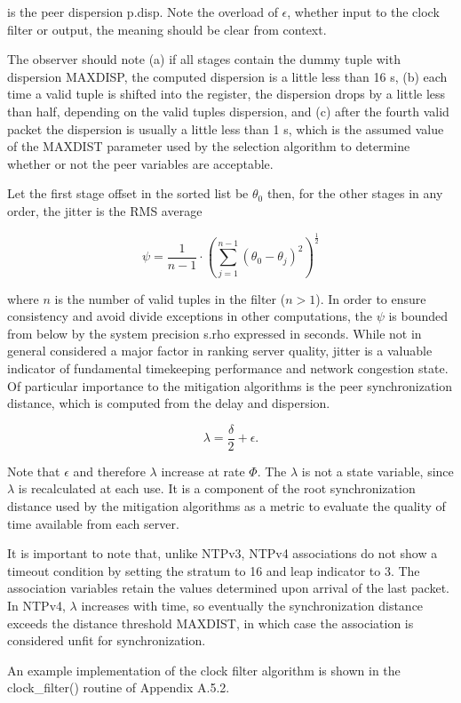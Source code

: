 is the peer dispersion p.disp.  Note the overload of $ \epsilon $, whether
input to the clock filter or output, the meaning should be clear from
context.

The observer should note (a) if all stages contain the dummy tuple
with dispersion MAXDISP, the computed dispersion is a little less
than 16 s, (b) each time a valid tuple is shifted into the register,
the dispersion drops by a little less than half, depending on the
valid tuples dispersion, and (c) after the fourth valid packet the
dispersion is usually a little less than 1 s, which is the assumed
value of the MAXDIST parameter used by the selection algorithm to
determine whether or not the peer variables are acceptable.

Let the first stage offset in the sorted list be $ \theta_0 $\; then, for
the other stages in any order, the jitter is the RMS average

$$
\psi = \frac{1}{n - 1} \cdot \left( \sum^{n - 1}_{j = 1} (\theta_0 - \theta_j)^2 \right)^{\frac{1}{2}}
$$

where $ n $ is the number of valid tuples in the filter ($ n > 1 $).  In
order to ensure consistency and avoid divide exceptions in other
computations, the $ \psi $ is bounded from below by the system precision
s.rho expressed in seconds.  While not in general considered a major
factor in ranking server quality, jitter is a valuable indicator of
fundamental timekeeping performance and network congestion state.  Of
particular importance to the mitigation algorithms is the peer
synchronization distance, which is computed from the delay and
dispersion.

$$
\lambda = \frac{\delta}{2} + \epsilon.
$$

Note that $ \epsilon $ and therefore $ \lambda $ increase at rate $ \Phi $.  The
$ \lambda $ is not a state variable, since $ \lambda $ is recalculated at each
use.  It is a component of the root synchronization distance used by
the mitigation algorithms as a metric to evaluate the quality of time
available from each server.

It is important to note that, unlike NTPv3, NTPv4 associations do not
show a timeout condition by setting the stratum to 16 and leap
indicator to 3.  The association variables retain the values
determined upon arrival of the last packet.  In NTPv4, $ \lambda $
increases with time, so eventually the synchronization distance
exceeds the distance threshold MAXDIST, in which case the association
is considered unfit for synchronization.

An example implementation of the clock filter algorithm is shown in
the clock\_filter() routine of Appendix A.5.2.
